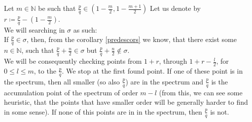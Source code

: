 Let $m \in \mathbb{N}$ be such that $\frac{p}{q} \in (1-\frac{m}{2},1-
\frac{m+1}{2})$
Let us denote by $r \coloneqq \frac{p}{q} - (1-\frac{m}{2})$. \\ 

We will searching in $\sigma$ as such: \\

If $\frac{p}{q} \in \sigma$, then, from the corollary \ref{predescors} we know, that there 
exist some $n \in \mathbb{N}$, such that $\frac{p}{q} + \frac{n}{2} \in \sigma$ but 
$\frac{p}{q} + \frac{n}{2} \not\in \sigma$. \\

We will be consequently checking points from $1+r$, through $1+r-\frac{l}{2}$, for 
$0 \leq l \leq m$, to the $\frac{p}{q}$. We stop at the first found point. 
If one of these point is in the spectrum, then all smaller (so also $\frac{p}{q}$) are in 
the spectrum and $\frac{p}{q}$ is the accumulation point of the spectrum of order $m-l$ 
(from this, 
 we can see some heuristic, that the points that have smaller order will be generally 
harder to find in some sense). If none of this points are in in the spectrum, then $\frac{p}{q}$ 
is not.






